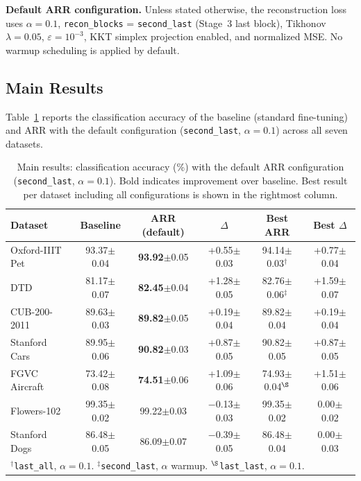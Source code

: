 \documentclass[review,12pt,authoryear]{elsarticle}
\newcommand{\std}[1]{{\scriptsize$\pm$#1}}
\newcommand{\method}{ARR}
\begin{document}
\textbf{Default \method{} configuration.}
Unless stated otherwise, the reconstruction loss uses $\alpha = 0.1$, \texttt{recon\_blocks} = \texttt{second\_last} (Stage~3 last block), Tikhonov $\lambda = 0.05$, $\varepsilon = 10^{-3}$, KKT simplex projection enabled, and normalized MSE.
No warmup scheduling is applied by default.

\subsection{Main Results}
\label{sec:exp:main}

Table~\ref{tab:main} reports the classification accuracy of the baseline (standard fine-tuning) and \method{} with the default configuration (\texttt{second\_last}, $\alpha = 0.1$) across all seven datasets.

\begin{table}[t]
\centering
\caption{Main results: classification accuracy (\%) with the default \method{} configuration (\texttt{second\_last}, $\alpha = 0.1$). Bold indicates improvement over baseline. Best result per dataset including all configurations is shown in the rightmost column.}
\label{tab:main}
\footnotesize
\setlength{\tabcolsep}{3pt}
\begin{tabular}{lccccc}
\toprule
Dataset & Baseline & \method{} (default) & $\Delta$ & Best \method{} & Best $\Delta$ \\
\midrule
Oxford-IIIT Pet  & 93.37\std{0.04} & \textbf{93.92}\std{0.05} & +0.55\std{0.03} & 94.14\std{0.03}$^{\dagger}$  & +0.77\std{0.04} \\
DTD              & 81.17\std{0.07} & \textbf{82.45}\std{0.04} & +1.28\std{0.05} & 82.76\std{0.06}$^{\ddagger}$ & +1.59\std{0.07} \\
CUB-200-2011     & 89.63\std{0.03} & \textbf{89.82}\std{0.05} & +0.19\std{0.04} & 89.82\std{0.04}              & +0.19\std{0.04} \\
Stanford Cars    & 89.95\std{0.06} & \textbf{90.82}\std{0.03} & +0.87\std{0.05} & 90.82\std{0.05}              & +0.87\std{0.05} \\
FGVC Aircraft    & 73.42\std{0.08} & \textbf{74.51}\std{0.06} & +1.09\std{0.06} & 74.93\std{0.04}$^{\S}$       & +1.51\std{0.06} \\
Flowers-102      & 99.35\std{0.02} & 99.22\std{0.03}          & $-$0.13\std{0.03} & 99.35\std{0.02}            & 0.00\std{0.02} \\
Stanford Dogs    & 86.48\std{0.05} & 86.09\std{0.07}          & $-$0.39\std{0.05} & 86.48\std{0.04}            & 0.00\std{0.03} \\
\bottomrule
\multicolumn{6}{l}{\footnotesize $^{\dagger}$\texttt{last\_all}, $\alpha=0.1$. \quad $^{\ddagger}$\texttt{second\_last}, $\alpha$ warmup. \quad $^{\S}$\texttt{last\_last}, $\alpha=0.1$.}
\end{tabular}
\end{table}
\end{document}
